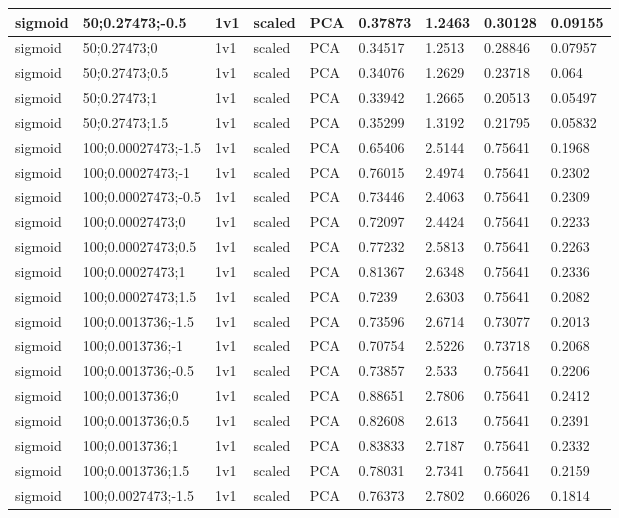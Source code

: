 \begin{longtable}{lllllllll}
sigmoid & 50;0.27473;-0.5 & 1v1 & scaled & PCA & 0.37873 & 1.2463 & 0.30128 & 0.09155\\ \hline
sigmoid & 50;0.27473;0 & 1v1 & scaled & PCA & 0.34517 & 1.2513 & 0.28846 & 0.07957\\ \hline
sigmoid & 50;0.27473;0.5 & 1v1 & scaled & PCA & 0.34076 & 1.2629 & 0.23718 & 0.064\\ \hline
sigmoid & 50;0.27473;1 & 1v1 & scaled & PCA & 0.33942 & 1.2665 & 0.20513 & 0.05497\\ \hline
sigmoid & 50;0.27473;1.5 & 1v1 & scaled & PCA & 0.35299 & 1.3192 & 0.21795 & 0.05832\\ \hline
sigmoid & 100;0.00027473;-1.5 & 1v1 & scaled & PCA & 0.65406 & 2.5144 & 0.75641 & 0.1968\\ \hline
sigmoid & 100;0.00027473;-1 & 1v1 & scaled & PCA & 0.76015 & 2.4974 & 0.75641 & 0.2302\\ \hline
sigmoid & 100;0.00027473;-0.5 & 1v1 & scaled & PCA & 0.73446 & 2.4063 & 0.75641 & 0.2309\\ \hline
sigmoid & 100;0.00027473;0 & 1v1 & scaled & PCA & 0.72097 & 2.4424 & 0.75641 & 0.2233\\ \hline
sigmoid & 100;0.00027473;0.5 & 1v1 & scaled & PCA & 0.77232 & 2.5813 & 0.75641 & 0.2263\\ \hline
sigmoid & 100;0.00027473;1 & 1v1 & scaled & PCA & 0.81367 & 2.6348 & 0.75641 & 0.2336\\ \hline
sigmoid & 100;0.00027473;1.5 & 1v1 & scaled & PCA & 0.7239 & 2.6303 & 0.75641 & 0.2082\\ \hline
sigmoid & 100;0.0013736;-1.5 & 1v1 & scaled & PCA & 0.73596 & 2.6714 & 0.73077 & 0.2013\\ \hline
sigmoid & 100;0.0013736;-1 & 1v1 & scaled & PCA & 0.70754 & 2.5226 & 0.73718 & 0.2068\\ \hline
sigmoid & 100;0.0013736;-0.5 & 1v1 & scaled & PCA & 0.73857 & 2.533 & 0.75641 & 0.2206\\ \hline
sigmoid & 100;0.0013736;0 & 1v1 & scaled & PCA & 0.88651 & 2.7806 & 0.75641 & 0.2412\\ \hline
sigmoid & 100;0.0013736;0.5 & 1v1 & scaled & PCA & 0.82608 & 2.613 & 0.75641 & 0.2391\\ \hline
sigmoid & 100;0.0013736;1 & 1v1 & scaled & PCA & 0.83833 & 2.7187 & 0.75641 & 0.2332\\ \hline
sigmoid & 100;0.0013736;1.5 & 1v1 & scaled & PCA & 0.78031 & 2.7341 & 0.75641 & 0.2159\\ \hline
sigmoid & 100;0.0027473;-1.5 & 1v1 & scaled & PCA & 0.76373 & 2.7802 & 0.66026 & 0.1814\\ \hline

\end{longtable}
